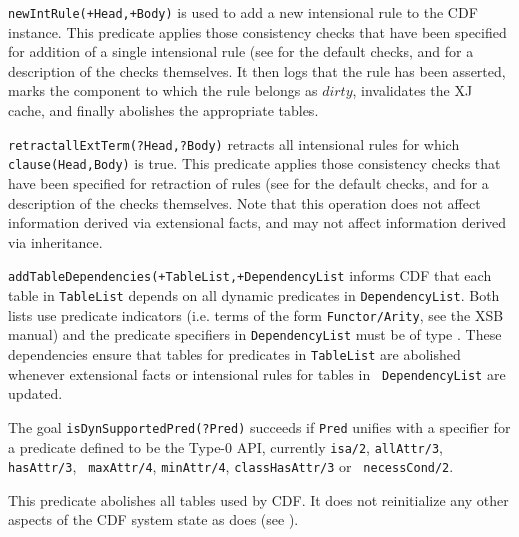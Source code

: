 \begin{description}
{\tt newIntRule(+Head,+Body)} is used to add a new intensional rule to
the CDF instance.  This predicate applies those consistency checks
that have been specified for addition of a single intensional rule
(see  for the default checks, and
 for a description of the checks themselves.  It
then logs that the rule has been asserted, marks the component to
which the rule belongs as $dirty$, invalidates the XJ cache, and
finally abolishes the appropriate tables.

{\tt retractallExtTerm(?Head,?Body)} retracts all intensional rules for
which {\tt clause(Head,Body)} is true.  This predicate applies those
consistency checks that have been specified for retraction of rules
(see  for the default checks, and
 for a description of the checks themselves.  Note
that this operation does not affect information derived via
extensional facts, and may not affect information derived via
inheritance.

{\tt addTableDependencies(+TableList,+DependencyList} informs CDF that
each table in {\tt TableList} depends on all dynamic predicates in
{\tt DependencyList}.  Both lists use predicate indicators (i.e. terms
of the form {\tt Functor/Arity}, see the XSB manual) and the predicate
specifiers in {\tt DependencyList} must be of type
.  These dependencies ensure that
tables for predicates in {\tt TableList} are abolished whenever
extensional facts or intensional rules for tables in {\tt
DependencyList} are updated.

The goal {\tt isDynSupportedPred(?Pred)} succeeds if {\tt Pred}
unifies with a specifier for a predicate defined to be the Type-0 API,
currently {\tt isa/2}, {\tt allAttr/3}, {\tt hasAttr/3}, {\tt
maxAttr/4}, {\tt minAttr/4}, {\tt classHasAttr/3} or {\tt
necessCond/2}.

This predicate abolishes all tables used by CDF.  It does not
reinitialize any other aspects of the CDF system state as does
 (see ).


\end{description}
